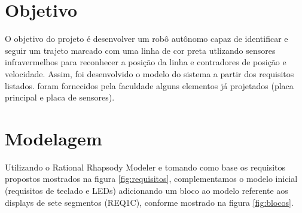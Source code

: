 \documentclass{article}
\begin{document}


\onehalfspacing
\section{Objetivo} 
O objetivo do projeto é desenvolver um robô autônomo capaz de identificar e seguir um trajeto marcado com uma linha de cor preta utlizando sensores infravermelhos para reconhecer a posição da linha e contradores de posição e velocidade. Assim, foi desenvolvido o modelo do sistema a partir dos requisitos listados. foram fornecidos pela faculdade alguns elementos já projetados (placa principal e placa de sensores).
	
\section{Modelagem}
Utilizando o Rational Rhapsody Modeler e tomando como base os requisitos propostos mostrados na figura \ref{fig:requisitos}, complementamos o modelo inicial\cite{bb:modelo} (requisitos de teclado e LEDs) adicionando um bloco ao modelo referente aos displays de sete segmentos (REQ1C), conforme mostrado na figura \ref{fig:blocos}.
\end{document}
